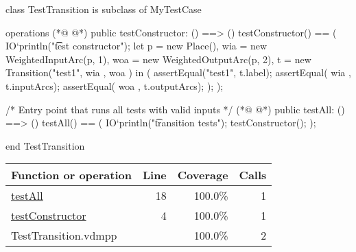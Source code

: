 \begin{vdmpp}
class TestTransition is subclass of MyTestCase

operations
(*@
\label{testConstructor:4}
@*)
  public testConstructor: () ==> ()
  testConstructor() == (
    IO`println("\t\t test constructor");
    let p = new Place(),
     wia = new WeightedInputArc(p, 1),
     woa = new WeightedOutputArc(p, 2),
     t = new Transition("test1", { wia }, { woa }) in (
      assertEqual("test1",  t.label);
      assertEqual({ wia }, t.inputArcs);
      assertEqual({ woa }, t.outputArcs);
    );
  );

  /* Entry point that runs all tests with valid inputs */
(*@
\label{testAll:18}
@*)
  public testAll: () ==> ()
  testAll() == (
    IO`println("\t transition tests");
    testConstructor();
  );

end TestTransition
\end{vdmpp}
\bigskip
\begin{longtable}{|l|r|r|r|}
\hline
Function or operation & Line & Coverage & Calls \\
\hline
\hline
\hyperref[testAll:18]{testAll} & 18&100.0\% & 1 \\
\hline
\hyperref[testConstructor:4]{testConstructor} & 4&100.0\% & 1 \\
\hline
\hline
TestTransition.vdmpp & & 100.0\% & 2 \\
\hline
\end{longtable}